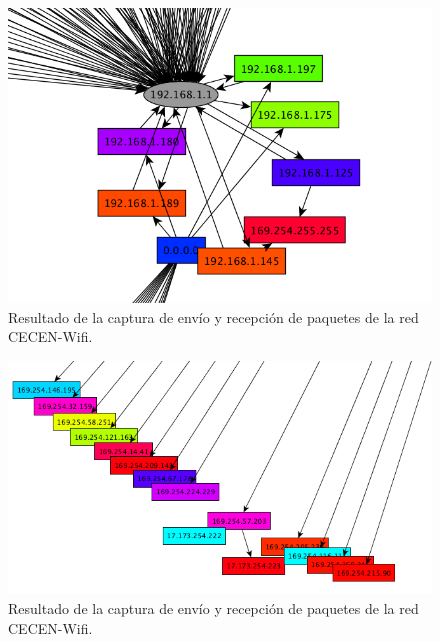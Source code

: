 \documentclass[10pt, a4paper]{article}
\begin{document}
\begin{figure}[H] %
\begin{center}
\includegraphics[width=400pt]{../imgs/cecen_centro.png}
\caption{Resultado de la captura de envío y recepción de paquetes de la red CECEN-Wifi.}
\end{center}
\end{figure}

\begin{figure}[H] %
\begin{center}
\includegraphics[width=400pt]{../imgs/cecen_costado.png}
\caption{Resultado de la captura de envío y recepción de paquetes de la red CECEN-Wifi.}
\end{center}
\end{figure}
\end{document}
